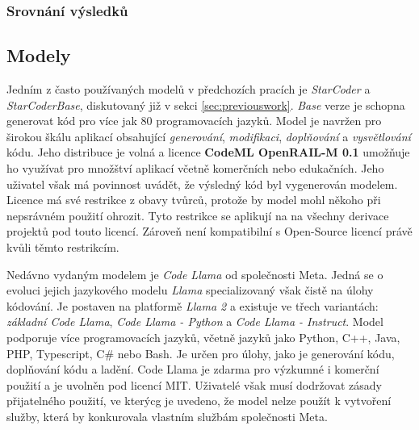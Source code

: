\documentclass[12pt]{article}
\begin{document}
            \subsubsection{Srovnání výsledků}


        \subsection{Modely}

            Jedním z často používaných modelů v předchozích pracích je \textit{StarCoder} a \textit{StarCoderBase}, diskutovaný již v sekci \ref{sec:previouswork}. \textit{Base} verze je schopna generovat kód pro více jak 80 programovacích jazyků. Model je navržen pro širokou škálu aplikací obsahující \textit{generování}, \textit{modifikaci}, \textit{doplňování} a \textit{vysvětlování} kódu. Jeho distribuce je volná a licence \textbf{CodeML OpenRAIL-M 0.1} \cite{BigCode2023} umožňuje ho využívat pro množštví aplikací včetně komerčních nebo edukačních. Jeho uživatel však má povinnost uvádět, že výsledný kód byl vygenerován modelem. Licence má své restrikce z obavy tvůrců, protože by model mohl někoho při nepsrávném použití ohrozit. Tyto restrikce se aplikují na na všechny derivace projektů pod touto licencí. Zároveň není kompatibilní s Open-Source licencí právě kvůli těmto restrikcím.

            Nedávno vydaným modelem je \textit{Code Llama} od společnosti Meta. Jedná se o evoluci jejich jazykového modelu \textit{Llama} specializovaný však čistě na úlohy kódování. Je postaven na platformě \textit{Llama 2} a existuje ve třech variantách: \textit{základní Code Llama}, \textit{Code Llama - Python} a \textit{Code Llama - Instruct}. Model podporuje více programovacích jazyků, včetně jazyků jako Python, C++, Java, PHP, Typescript, C# nebo Bash. Je určen pro úlohy, jako je generování kódu, doplňování kódu a ladění. Code Llama je zdarma pro výzkumné i komerční použití a je uvolněn pod licencí MIT. Uživatelé však musí dodržovat  zásady přijatelného použití, ve kterýcg je uvedeno, že model nelze použít k vytvoření služby, která by konkurovala vlastním službám společnosti Meta. 
\end{document}
